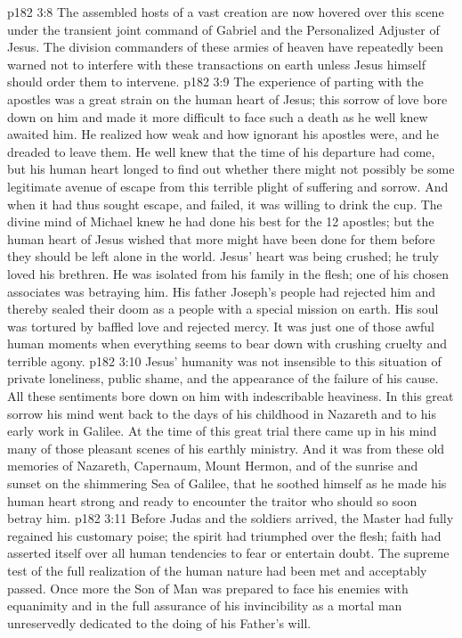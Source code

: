 \vs p182 3:8 The assembled hosts of a vast creation are now hovered over this scene under the transient joint command of Gabriel and the Personalized Adjuster of Jesus. The division commanders of these armies of heaven have repeatedly been warned not to interfere with these transactions on earth unless Jesus himself should order them to intervene.
\vs p182 3:9 \pc The experience of parting with the apostles was a great strain on the human heart of Jesus; this sorrow of love bore down on him and made it more difficult to face such a death as he well knew awaited him. He realized how weak and how ignorant his apostles were, and he dreaded to leave them. He well knew that the time of his departure had come, but his human heart longed to find out whether there might not possibly be some legitimate avenue of escape from this terrible plight of suffering and sorrow. And when it had thus sought escape, and failed, it was willing to drink the cup. The divine mind of Michael knew he had done his best for the 12 apostles; but the human heart of Jesus wished that more might have been done for them before they should be left alone in the world. Jesus’ heart was being crushed; he truly loved his brethren. He was isolated from his family in the flesh; one of his chosen associates was betraying him. His father Joseph’s people had rejected him and thereby sealed their doom as a people with a special mission on earth. His soul was tortured by baffled love and rejected mercy. It was just one of those awful human moments when everything seems to bear down with crushing cruelty and terrible agony.
\vs p182 3:10 Jesus’ humanity was not insensible to this situation of private loneliness, public shame, and the appearance of the failure of his cause. All these sentiments bore down on him with indescribable heaviness. In this great sorrow his mind went back to the days of his childhood in Nazareth and to his early work in Galilee. At the time of this great trial there came up in his mind many of those pleasant scenes of his earthly ministry. And it was from these old memories of Nazareth, Capernaum, Mount Hermon, and of the sunrise and sunset on the shimmering Sea of Galilee, that he soothed himself as he made his human heart strong and ready to encounter the traitor who should so soon betray him.
\vs p182 3:11 Before Judas and the soldiers arrived, the Master had fully regained his customary poise; the spirit had triumphed over the flesh; faith had asserted itself over all human tendencies to fear or entertain doubt. The supreme test of the full realization of the human nature had been met and acceptably passed. Once more the Son of Man was prepared to face his enemies with equanimity and in the full assurance of his invincibility as a mortal man unreservedly dedicated to the doing of his Father’s will.
